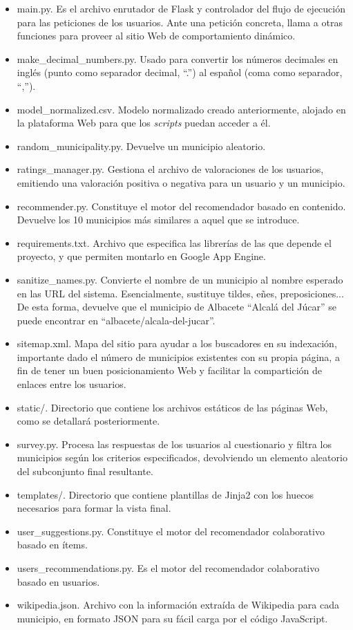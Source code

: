 \begin{itemize}
	\item main.py. Es el archivo enrutador de Flask y controlador del flujo de ejecución para las peticiones de los usuarios. Ante una petición concreta, llama a otras funciones para proveer al sitio Web de comportamiento dinámico.
	\item make\_decimal\_numbers.py. Usado para convertir los números decimales en inglés (punto como separador decimal, ``.'') al español (coma como separador, ``,'').
	\item model\_normalized.csv. Modelo normalizado creado anteriormente, alojado en la plataforma Web para que los \textit{scripts} puedan acceder a él.
	\item random\_municipality.py. Devuelve un municipio aleatorio.
	\item ratings\_manager.py. Gestiona el archivo de valoraciones de los usuarios, emitiendo una valoración positiva o negativa para un usuario y un municipio.
	\item recommender.py. Constituye el motor del recomendador basado en contenido. Devuelve los 10 municipios más similares a aquel que se introduce.
	\item requirements.txt. Archivo que especifica las librerías de las que depende el proyecto, y que permiten montarlo en Google App Engine.
	\item sanitize\_names.py. Convierte el nombre de un municipio al nombre esperado en las URL del sistema. Esencialmente, sustituye tildes, eñes, preposiciones... De esta forma, devuelve que el municipio de Albacete ``Alcalá del Júcar'' se puede encontrar en ``albacete/alcala-del-jucar''.
	\item sitemap.xml. Mapa del sitio para ayudar a los buscadores en su indexación, importante dado el número de municipios existentes con su propia página, a fin de tener un buen posicionamiento Web y facilitar la compartición de enlaces entre los usuarios.
	\item static/. Directorio que contiene los archivos estáticos de las páginas Web, como se detallará posteriormente.
	\item survey.py. Procesa las respuestas de los usuarios al cuestionario y filtra los municipios según los criterios especificados, devolviendo un elemento aleatorio del subconjunto final resultante.
	\item templates/. Directorio que contiene plantillas de Jinja2 con los huecos necesarios para formar la vista final.
	\item user\_suggestions.py. Constituye el motor del recomendador colaborativo basado en ítems.
	\item users\_recommendations.py. Es el motor del recomendador colaborativo basado en usuarios.
	\item wikipedia.json. Archivo con la información extraída de Wikipedia para cada municipio, en formato JSON para su fácil carga por el código JavaScript.

\end{itemize}

